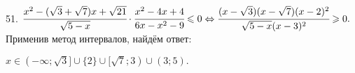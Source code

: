 51. $\cfrac{x^2-(\sqrt{3}+\sqrt{7})x+\sqrt{21}}{\sqrt{5-x}}\cdot\cfrac{x^2-4x+4}{6x-x^2-9}\leqslant 0\Leftrightarrow
\cfrac{(x-\sqrt{3})(x-\sqrt{7})(x-2)^2}{\sqrt{5-x}(x-3)^2}\geqslant 0.$ Применив метод интервалов, найдём ответ:
\begin{figure}[ht!]
\end{figure}
$x\in(-\infty;\sqrt{3}]\cup\{2\}\cup[\sqrt{7};3)\cup(3;5).$\\
